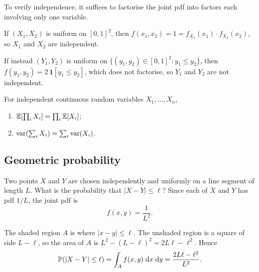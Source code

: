 \documentclass[a4paper]{article}
\begin{document}
\begin{remark}
  To verify independence, it suffices to factorise the joint pdf into factors each involving only one variable.
\end{remark}

\begin{eg}
  If $(X_1, X_2)$ is uniform on $[0, 1]^2$, then $f(x_1, x_2) = 1 = f_{X_1}(x_1) \cdot f_{X_2}(x_2)$, so $X_1$ and $X_2$ are independent.

  If instead $(Y_1, Y_2)$ is uniform on $\{(y_1, y_2) \in [0, 1]^2 : y_1 \leq y_2\}$, then $f(y_1, y_2) = 2\, \mathbf{1}[y_1 \leq y_2]$, which does not factorise, so $Y_1$ and $Y_2$ are not independent.
\end{eg}

\begin{prop}
  For independent continuous random variables $X_1, \dotsc, X_n$,
  \begin{enumerate}
    \item $\mathbb{E}[\prod_i X_i] = \prod_i \mathbb{E}[X_i]$;
    \item $\operatorname{var}(\sum_i X_i) = \sum_i \operatorname{var}(X_i)$.
  \end{enumerate}
\end{prop}

\subsection{Geometric probability}
\begin{eg}
  Two points $X$ and $Y$ are chosen independently and uniformly on a line segment of length $L$.
  What is the probability that $|X - Y| \leq \ell$?
  Since each of $X$ and $Y$ has pdf $1/L$, the joint pdf is
  \[
    f(x, y) = \frac{1}{L^2}.
  \]
  \begin{center}
  \end{center}
  The shaded region $A$ is where $|x - y| \leq \ell$.
  The unshaded region is a square of side $L - \ell$, so the area of $A$ is $L^2 - (L - \ell)^2 = 2L\ell - \ell^2$.
  Hence
  \[
    \mathbb{P}(|X - Y| \leq \ell) = \int_A f(x, y)\;\mathrm{d} x\;\mathrm{d} y = \frac{2L\ell - \ell^2}{L^2}.
  \]
\end{eg}
\end{document}
